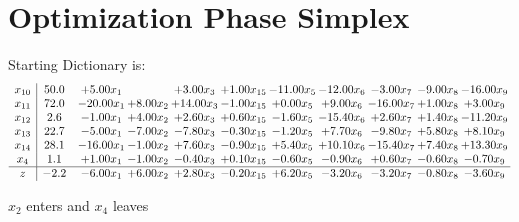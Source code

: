 \documentclass[9pt]{article}
\begin{document}
\section{Optimization Phase Simplex}
Starting Dictionary is:
\[\begin{array}{c| c c@{\hskip 2pt} c@{\hskip 2pt} c@{\hskip 2pt} c@{\hskip 2pt} c@{\hskip 2pt} c@{\hskip 2pt} c@{\hskip 2pt} c@{\hskip 2pt} c@{\hskip 2pt} }
 x_{10}   &  50.0 & +  5.00 x_{1} &   & +  3.00 x_{3} & +  1.00 x_{15} & -11.00 x_{5} & -12.00 x_{6} & -3.00 x_{7} & -9.00 x_{8} & -16.00 x_{9}\\
 x_{11}   &  72.0 & -20.00 x_{1} & +  8.00 x_{2} & + 14.00 x_{3} & -1.00 x_{15} & +  0.00 x_{5} & +  9.00 x_{6} & -16.00 x_{7} & +  1.00 x_{8} & +  3.00 x_{9}\\
 x_{12}   &  2.6 & -1.00 x_{1} & +  4.00 x_{2} & +  2.60 x_{3} & +  0.60 x_{15} & -1.60 x_{5} & -15.40 x_{6} & +  2.60 x_{7} & +  1.40 x_{8} & -11.20 x_{9}\\
 x_{13}   &  22.7 & -5.00 x_{1} & -7.00 x_{2} & -7.80 x_{3} & -0.30 x_{15} & -1.20 x_{5} & +  7.70 x_{6} & -9.80 x_{7} & +  5.80 x_{8} & +  8.10 x_{9}\\
 x_{14}   &  28.1 & -16.00 x_{1} & -1.00 x_{2} & +  7.60 x_{3} & -0.90 x_{15} & +  5.40 x_{5} & + 10.10 x_{6} & -15.40 x_{7} & +  7.40 x_{8} & + 13.30 x_{9}\\
 x_{4}   &  1.1 & +  1.00 x_{1} & -1.00 x_{2} & -0.40 x_{3} & +  0.10 x_{15} & -0.60 x_{5} & -0.90 x_{6} & +  0.60 x_{7} & -0.60 x_{8} & -0.70 x_{9}\\
\hline
z    &  -2.2 & -6.00 x_{1} & +  6.00 x_{2} & +  2.80 x_{3} & -0.20 x_{15} & +  6.20 x_{5} & -3.20 x_{6} & -3.20 x_{7} & -0.80 x_{8} & -3.60 x_{9}\\
\end{array}\]


 $ x_{2} $ enters and $ x_{4} $ leaves 
\end{document}
